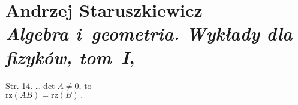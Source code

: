 \documentclass[a4paper,11pt]{article}
\numberwithin{equation}{section}
\begin{document}
\VerSpaceSix














\newpage

\section{ %
  Andrzej Staruszkiewicz \\
  \textit{Algebra i~geometria. Wykłady dla fizyków, tom~I}, \cite{ASAG}}

\vspace{0em}



\vspace{0em}


Str. 14. \ldots $\det A \neq 0$, to \\
$\textrm{rz} ( AB ) = \textrm{rz} ( B ) \, .$ \\













\printbibliography





\end{document}
